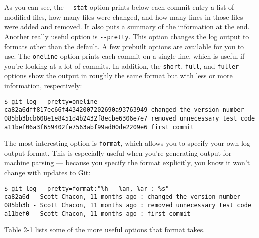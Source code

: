 \documentclass[a4paper]{book}
\begin{document}
As you can see, the \texttt{-{}-stat} option prints below each commit entry a list of modified files, how many files were changed, and how many lines in those files were added and removed. It also puts a summary of the information at the end. Another really useful option is \texttt{-{}-pretty}. This option changes the log output to formats other than the default. A few prebuilt options are available for you to use. The \texttt{oneline} option prints each commit on a single line, which is useful if you're looking at a lot of commits. In addition, the \texttt{short}, \texttt{full}, and \texttt{fuller} options show the output in roughly the same format but with less or more information, respectively:

\begin{shaded}\begin{verbatim}
$ git log --pretty=oneline
ca82a6dff817ec66f44342007202690a93763949 changed the version number
085bb3bcb608e1e8451d4b2432f8ecbe6306e7e7 removed unnecessary test code
a11bef06a3f659402fe7563abf99ad00de2209e6 first commit
\end{verbatim}\end{shaded}

The most interesting option is \texttt{format}, which allows you to specify your own log output format. This is especially useful when you're generating output for machine parsing --- because you specify the format explicitly, you know it won't change with updates to Git:

\begin{shaded}\begin{verbatim}
$ git log --pretty=format:"%h - %an, %ar : %s"
ca82a6d - Scott Chacon, 11 months ago : changed the version number
085bb3b - Scott Chacon, 11 months ago : removed unnecessary test code
a11bef0 - Scott Chacon, 11 months ago : first commit
\end{verbatim}\end{shaded}

Table 2-1 lists some of the more useful options that format takes.
\end{document}

